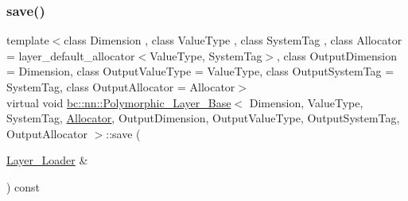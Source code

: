\mbox{\label{structbc_1_1nn_1_1Polymorphic__Layer__Base_aa3a70d0ea45bdd0d9f9932d7fafe3d3e}} 
\subsubsection{\texorpdfstring{save()}{save()}\hspace{0.1cm}{\footnotesize\ttfamily [2/2]}}
{\footnotesize\ttfamily template$<$class Dimension , class Value\+Type , class System\+Tag , class Allocator  = layer\+\_\+default\+\_\+allocator$<$\+Value\+Type, System\+Tag$>$, class Output\+Dimension  = Dimension, class Output\+Value\+Type  = Value\+Type, class Output\+System\+Tag  = System\+Tag, class Output\+Allocator  = Allocator$>$ \\
virtual void \hyperlink{structbc_1_1nn_1_1Polymorphic__Layer__Base}{bc\+::nn\+::\+Polymorphic\+\_\+\+Layer\+\_\+\+Base}$<$ Dimension, Value\+Type, System\+Tag, \hyperlink{classbc_1_1allocators_1_1Allocator}{Allocator}, Output\+Dimension, Output\+Value\+Type, Output\+System\+Tag, Output\+Allocator $>$\+::save (\begin{DoxyParamCaption}\item[{\hyperlink{structbc_1_1nn_1_1Layer__Loader}{Layer\+\_\+\+Loader} \&}]{ }\end{DoxyParamCaption}) const\hspace{0.3cm}{\ttfamily [pure virtual]}}

\mbox{\label{structbc_1_1nn_1_1Polymorphic__Layer__Base_a7ec52a754f51ae14d655de2e7ae2e1a6}} 
